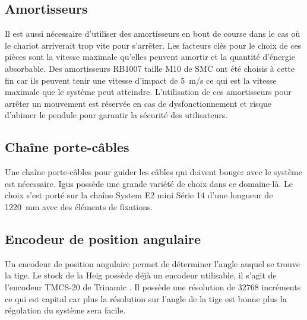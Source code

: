 \subsection{Amortisseurs}\label{subsec:Amortisseurs}
Il est aussi nécessaire d'utiliser des amortisseurs en bout de course dans le cas où le chariot arriverait trop vite pour s'arrêter. Les facteurs clés pour le choix
de ces pièces sont la vitesse maximale qu'elles peuvent amortir et la quantité d'énergie absorbable. Des amortisseurs RB1007 taille M10
de SMC \cite{SMC} ont été choisis à cette fin car ils peuvent tenir une vitesse d'impact de 5~m/s ce qui est la vitesse maximale que le système
peut atteindre. L'utilisation de ces amortisseurs pour arrêter un mouvement est réservée en cas de dysfonctionnement et risque d'abimer le pendule
pour garantir la sécurité des utilisateurs.

\subsection{Chaîne porte-câbles}
Une chaîne porte-câbles pour guider les câbles qui doivent bouger avec le système est nécessaire. Igus \cite{Igus} possède une grande variété de choix dans
ce domaine-là. Le choix s'est porté sur la chaîne System E2 mini Série 14 d'une longueur de 1220~mm avec des éléments de fixations.

\subsection{Encodeur de position angulaire}
Un encodeur de position angulaire permet de déterminer l'angle auquel se trouve la tige. Le stock de la \acrshort{Heig} possède déjà un encodeur
utilisable, il s'agit de l'encodeur TMCS-20 de Trinamic \cite{Trinamic}. Il possède une résolution de 32768 incréments ce qui est capital car
plus la résolution sur l'angle de la tige est bonne plus la régulation du système sera facile.